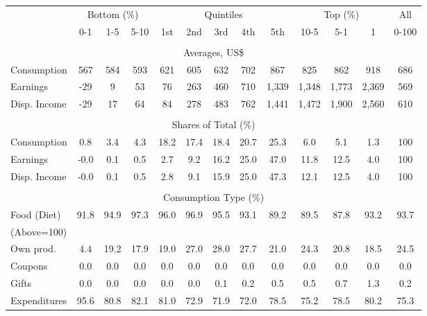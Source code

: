 \begin{tabular}{l c c c| c c c c c| c c c| c}
\toprule
&\multicolumn{3}{c|}{Bottom (\%)} & \multicolumn{5}{c|}{Quintiles} & \multicolumn{3}{c|}{Top (\%)} & All  \\
& 0-1 & 1-5 & 5-10 &  1st & 2nd & 3rd & 4th & 5th & 10-5 & 5-1 & 1 & 0-100 \\
\midrule \\
\multicolumn{13}{c}{Averages, US\$} \\
\midrule
Consumption  & 567  & 584  & 593  & 621  & 605  & 632  & 702  & 867  & 825  & 862  & 918  & 686 \\
Earnings         & -29 & 9 & 53 & 76 & 263 & 460 & 710 & 1,339 & 1,348 & 1,773 & 2,369 & 569 \\
Disp. Income & -29 & 17 & 64 & 84 & 278 & 483 & 762 & 1,441 & 1,472 & 1,900 & 2,560 & 610 \\
\midrule \\
\multicolumn{13}{c}{Shares of Total (\%)} \\
\midrule
Consumption  & 0.8   & 3.4   & 4.3   & 18.2   & 17.4   & 18.4   & 20.7   & 25.3   & 6.0   & 5.1   & 1.3   & 100 \\
Earnings         & -0.0  & 0.1  & 0.5  & 2.7  & 9.2  & 16.2  & 25.0  & 47.0  & 11.8  & 12.5  & 4.0  & 100 \\
Disp. Income & -0.0  & 0.1  & 0.5  & 2.8  & 9.1  & 15.9  & 25.0  & 47.3  & 12.1  & 12.5  & 4.0  & 100 \\
\midrule \\
\multicolumn{13}{c}{Consumption Type (\%)}  \\
\midrule
Food (Diet)  & 91.8 & 94.9 & 97.3 & 96.0 & 96.9 & 95.5 & 93.1 & 89.2 & 89.5 & 87.8 & 93.2 & 93.7 \\
(Above=100) & & & & & & & & & & & &  \\
\hspace{.3cm} Own prod.  & 4.4 & 19.2 & 17.9 & 19.0 & 27.0 & 28.0 & 27.7 & 21.0 & 24.3 & 20.8 & 18.5 & 24.5 \\
\hspace{.3cm} Coupons    & 0.0 & 0.0 & 0.0 & 0.0 & 0.0 & 0.0 & 0.0 & 0.0 & 0.0 & 0.0 & 0.0 & 0.0 \\
\hspace{.3cm} Gifts      & 0.0 & 0.0 & 0.0 & 0.0 & 0.0 & 0.1 & 0.2 & 0.5 & 0.5 & 0.7 & 1.3 & 0.2 \\
\hspace{.3cm} Expenditures  & 95.6 & 80.8 & 82.1 & 81.0 & 72.9 & 71.9 & 72.0 & 78.5 & 75.2 & 78.5 & 80.2 & 75.3 \\

\end{tabular}
